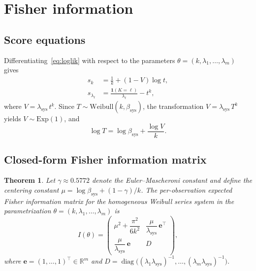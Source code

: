 \documentclass[12pt]{article}
\newtheorem{theorem}{Theorem}
\theoremstyle{remark}
\newcommand{\lsys}{\lambda_{\mathrm{sys}}}
\newcommand{\bsys}{\beta_{\mathrm{sys}}}
\newcommand{\ind}{\mathbf{1}}
\newcommand{\ee}{\mathbf{e}}
\begin{document}
\section{Fisher information}\label{sec:fim}

\subsection{Score equations}

Differentiating~\eqref{eq:loglik} with respect to the parameters
$\theta = (k, \lambda_1, \ldots, \lambda_m)$ gives
%
\begin{align}
s_k &= \frac{1}{k} + (1 - V)\log t, \label{eq:score_k}\\
s_{\lambda_\ell} &= \frac{\ind(K = \ell)}{\lambda_\ell} - t^k,
  \label{eq:score_lam}
\end{align}
%
where $V = \lsys\,t^k$.  Since
$T \sim \mathrm{Weibull}(k, \bsys)$, the transformation
$V = \lsys\,T^k$ yields $V \sim \mathrm{Exp}(1)$, and
%
\begin{equation}\label{eq:logT}
\log T = \log \bsys + \frac{\log V}{k}.
\end{equation}

\subsection{Closed-form Fisher information matrix}

\begin{theorem}\label{thm:fim}
Let\/ $\gamma \approx 0.5772$ denote the Euler--Mascheroni constant and
define the centering constant $\mu = \log \bsys + (1-\gamma)/k$.  The
per-observation expected Fisher information matrix for the homogeneous
Weibull series system in the parametrization
$\theta = (k, \lambda_1, \ldots, \lambda_m)$ is
%
\begin{equation}\label{eq:fim}
I(\theta)
= \begin{pmatrix}
  \mu^2 + \dfrac{\pi^2}{6k^2}
    & \dfrac{\mu}{\lsys}\,\ee^\top \\[10pt]
  \dfrac{\mu}{\lsys}\,\ee
    & D
  \end{pmatrix},
\end{equation}
%
where $\ee = (1, \ldots, 1)^\top \in \mathbb{R}^m$ and
$D = \operatorname{diag}\!\bigl(
  (\lambda_1\lsys)^{-1}, \ldots, (\lambda_m\lsys)^{-1}\bigr)$.
\end{theorem}
\end{document}
